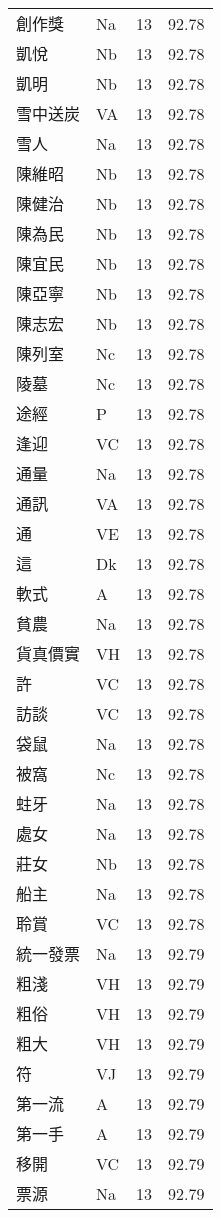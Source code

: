 \documentclass[twocolumn]{book}
\begin{document}
\begin{supertabular}{llrr}
創作獎 & Na & 13 &  92.78\\
凱悅 & Nb & 13 &  92.78\\
凱明 & Nb & 13 &  92.78\\
雪中送炭 & VA & 13 &  92.78\\
雪人 & Na & 13 &  92.78\\
陳維昭 & Nb & 13 &  92.78\\
陳健治 & Nb & 13 &  92.78\\
陳為民 & Nb & 13 &  92.78\\
陳宜民 & Nb & 13 &  92.78\\
陳亞寧 & Nb & 13 &  92.78\\
陳志宏 & Nb & 13 &  92.78\\
陳列室 & Nc & 13 &  92.78\\
陵墓 & Nc & 13 &  92.78\\
途經 & P & 13 &  92.78\\
逢迎 & VC & 13 &  92.78\\
通量 & Na & 13 &  92.78\\
通訊 & VA & 13 &  92.78\\
通 & VE & 13 &  92.78\\
這 & Dk & 13 &  92.78\\
軟式 & A & 13 &  92.78\\
貧農 & Na & 13 &  92.78\\
貨真價實 & VH & 13 &  92.78\\
許 & VC & 13 &  92.78\\
訪談 & VC & 13 &  92.78\\
袋鼠 & Na & 13 &  92.78\\
被窩 & Nc & 13 &  92.78\\
蛀牙 & Na & 13 &  92.78\\
處女 & Na & 13 &  92.78\\
莊女 & Nb & 13 &  92.78\\
船主 & Na & 13 &  92.78\\
聆賞 & VC & 13 &  92.78\\
統一發票 & Na & 13 &  92.79\\
粗淺 & VH & 13 &  92.79\\
粗俗 & VH & 13 &  92.79\\
粗大 & VH & 13 &  92.79\\
符 & VJ & 13 &  92.79\\
第一流 & A & 13 &  92.79\\
第一手 & A & 13 &  92.79\\
移開 & VC & 13 &  92.79\\
票源 & Na & 13 &  92.79\\

\end{supertabular}
\end{document}
